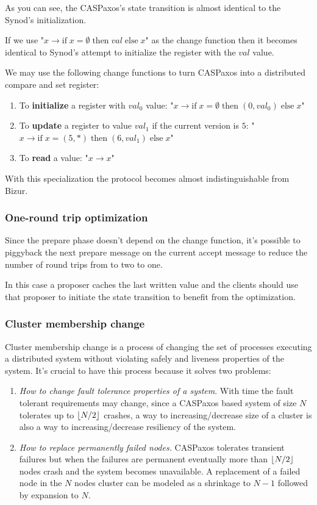 \documentclass[12pt]{article}
\theoremstyle{definition}
\DeclarePairedDelimiter{\floor}{\lfloor}{\rfloor}
\begin{document}
As you can see, the CASPaxos's state transition is almost identical to the Synod's initialization. 

If we use "$x \to \mbox{if}\; x = \emptyset \;\mbox{then}\; val\; \mbox{else}\; x$" as the change function then it becomes identical to Synod's attempt to initialize the register with the $val$ value.

We may use the following change functions to turn CASPaxos into a distributed compare and set register:
\begin{enumerate}
  \item To {\bf initialize} a register with $val_0$ value: "$x \to \mbox{if}\; x = \emptyset \;\mbox{then}\; (0, val_0)\; \mbox{else}\; x$"
  \item To {\bf update} a register to value $val_1$ if the current version is $5$: "$x \to \mbox{if}\; x = (5, \ast) \;\mbox{then}\; (6, val_1)\; \mbox{else}\; x$"
  \item To {\bf read} a value: "$x \to x$"
\end{enumerate}

With this specialization the protocol becomes almost indistinguishable from Bizur\cite{bizur}.

\subsubsection{One-round trip optimization}

Since the prepare phase doesn't depend on the change function, it's possible to piggyback the next prepare message on the current accept message to reduce the number of round trips from to two to one.

In this case a proposer caches the last written value and the clients should use that proposer to initiate the state transition to benefit from the optimization.

\subsubsection{Cluster membership change}

Cluster membership change is a process of changing the set of processes executing a distributed system without violating safely and liveness properties of the system. It's crucial to have this process because it solves two problems:

\begin{enumerate}
  \item {\it How to change fault tolerance properties of a system}. With time the fault tolerant requirements may change, since a CASPaxos based system of size $N$ tolerates up to $\floor{N/2}$ crashes, a way to increasing/decrease size of a cluster is also a way to increasing/decrease resiliency of the system.

  \item {\it How to replace permanently failed nodes.} CASPaxos tolerates transient failures but when the failures are permanent eventually more than $\floor{N/2}$ nodes crash and the system becomes unavailable. A replacement of a failed node in the $N$ nodes cluster can be modeled as a shrinkage to $N-1$ followed by expansion to $N$.
\end{enumerate}
\end{document}
